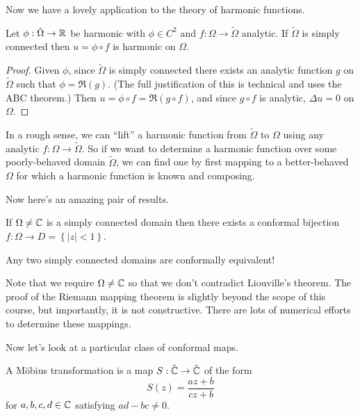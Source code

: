 \documentclass[../m136main.tex]{subfiles}
\begin{document}
Now we have a lovely application to the theory of harmonic functions.

\begin{theorem}[]
    Let $\phi : \tilde \Omega \to \mathbb{R}$ be harmonic with $\phi \in C^2$ and $f : \Omega \to \tilde \Omega$ analytic.
    If $\tilde \Omega$ is simply connected then $u = \phi \circ f$ is harmonic on $\Omega$.
\end{theorem}

\begin{proof}
    Given $\phi$, since $\tilde \Omega$ is simply connected there exists an analytic function $g$ on $\tilde \Omega$ such that $\phi = \Re(g)$.
    (The full justification of this is technical and uses the ABC theorem.)
    Then $u = \phi \circ f = \Re(g \circ f)$, and since $g \circ f$ is analytic, $\Delta u = 0$ on $\Omega$.
\end{proof}

In a rough sense, we can ``lift'' a harmonic function from $\tilde \Omega$ to $\Omega$ using any analytic $f : \Omega \to \tilde \Omega$.
So if we want to determine a harmonic function over some poorly-behaved domain $\tilde \Omega$, we can find one by first mapping to a better-behaved $\Omega$ for which a harmonic function is known and composing.

Now here's an amazing pair of results.

\begin{theorem}
    If $\Omega \neq \mathbb{C}$ is a simply connected domain then there exists a conformal bijection $f : \Omega \to D = \left\{ |z| < 1 \right\}$.
\end{theorem}

\begin{corollary}[]
    Any two simply connected domains are conformally equivalent!
\end{corollary}

Note that we require $\Omega \neq \mathbb{C}$ so that we don't contradict Liouville's theorem.
The proof of the Riemann mapping theorem is slightly beyond the scope of this course, but importantly, it is not constructive.
There are lots of numerical efforts to determine these mappings.

Now let's look at a particular class of conformal maps.

\begin{definition}
    A Möbius transformation is a map $S : \hat {\mathbb{C}} \to \hat {\mathbb{C}}$ of the form
    \[ S(z) = \frac{az + b}{cz + b} \]
    for $a,b,c,d \in \mathbb{C}$ satisfying $ad - bc \neq 0$.
\end{definition}
\end{document}
